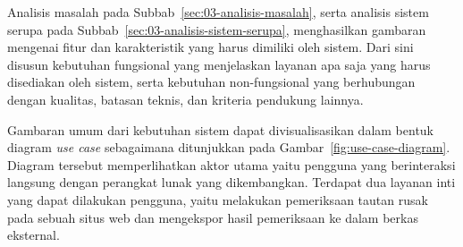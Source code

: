 Analisis masalah pada Subbab~\ref{sec:03-analisis-masalah}, serta analisis sistem serupa pada Subbab~\ref{sec:03-analisis-sistem-serupa}, menghasilkan gambaran mengenai fitur dan karakteristik yang harus dimiliki oleh sistem. Dari sini disusun kebutuhan fungsional yang menjelaskan layanan apa saja yang harus disediakan oleh sistem, serta kebutuhan non-fungsional yang berhubungan dengan kualitas, batasan teknis, dan kriteria pendukung lainnya.


Gambaran umum dari kebutuhan sistem dapat divisualisasikan dalam bentuk diagram \textit{use case} sebagaimana ditunjukkan pada Gambar~\ref{fig:use-case-diagram}. Diagram tersebut memperlihatkan aktor utama yaitu pengguna yang berinteraksi langsung dengan perangkat lunak yang dikembangkan. Terdapat dua layanan inti yang dapat dilakukan pengguna, yaitu melakukan pemeriksaan tautan rusak pada sebuah situs web dan mengekspor hasil pemeriksaan ke dalam berkas eksternal. 


